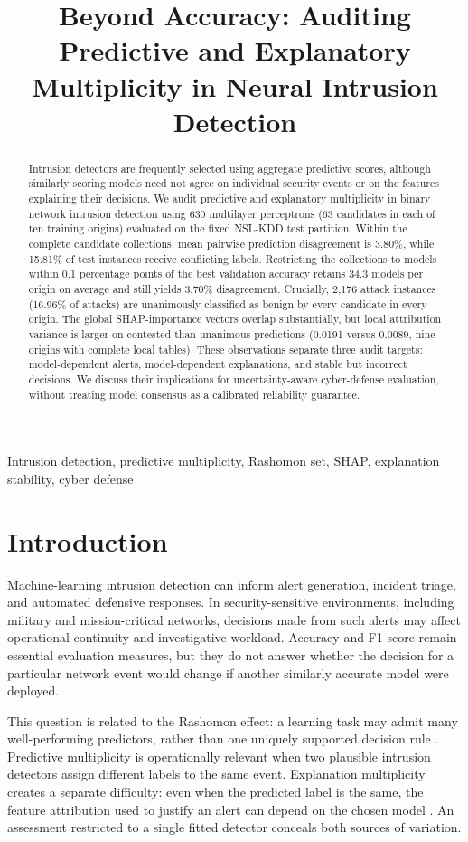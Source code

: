 \documentclass[10pt,conference]{IEEEtran}
\title{Beyond Accuracy: Auditing Predictive and Explanatory Multiplicity in Neural Intrusion Detection}
\author{\IEEEauthorblockN{Silja Kluge}\IEEEauthorblockA{CortAIx Labs, Thales Deutschland, Ditzingen, Germany\\Eberhard Karls University of T\"ubingen, T\"ubingen, Germany\\silja.kluge@thalesgroup.com}}
\begin{document}
\maketitle
\begin{abstract}
Intrusion detectors are frequently selected using aggregate predictive scores, although similarly scoring models need not agree on individual security events or on the features explaining their decisions. We audit predictive and explanatory multiplicity in binary network intrusion detection using 630 multilayer perceptrons (63 candidates in each of ten training origins) evaluated on the fixed NSL-KDD test partition. Within the complete candidate collections, mean pairwise prediction disagreement is 3.80\%, while 15.81\% of test instances receive conflicting labels. Restricting the collections to models within 0.1 percentage points of the best validation accuracy retains 34.3 models per origin on average and still yields 3.70\% disagreement. Crucially, 2,176 attack instances (16.96\% of attacks) are unanimously classified as benign by every candidate in every origin. The global SHAP-importance vectors overlap substantially, but local attribution variance is larger on contested than unanimous predictions (0.0191 versus 0.0089, nine origins with complete local tables). These observations separate three audit targets: model-dependent alerts, model-dependent explanations, and stable but incorrect decisions. We discuss their implications for uncertainty-aware cyber-defense evaluation, without treating model consensus as a calibrated reliability guarantee.
\end{abstract}
\begin{IEEEkeywords}
Intrusion detection, predictive multiplicity, Rashomon set, SHAP, explanation stability, cyber defense
\end{IEEEkeywords}
\section{Introduction}
Machine-learning intrusion detection can inform alert generation, incident triage, and automated defensive responses. In security-sensitive environments, including military and mission-critical networks, decisions made from such alerts may affect operational continuity and investigative workload. Accuracy and F1 score remain essential evaluation measures, but they do not answer whether the decision for a particular network event would change if another similarly accurate model were deployed.

This question is related to the Rashomon effect: a learning task may admit many well-performing predictors, rather than one uniquely supported decision rule \cite{breiman2001,black2022,hsu2022}. Predictive multiplicity is operationally relevant when two plausible intrusion detectors assign different labels to the same event. Explanation multiplicity creates a separate difficulty: even when the predicted label is the same, the feature attribution used to justify an alert can depend on the chosen model \cite{brunet2022,laberge2023}. An assessment restricted to a single fitted detector conceals both sources of variation.
\end{document}

